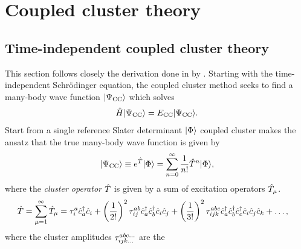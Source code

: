 \chapter{Coupled cluster theory}


    \section{Time-independent coupled cluster theory}
        This section follows closely the derivation done in
         by
        \citeauthor{crawford2000introduction} \cite{crawford2000introduction}.
        Starting with the time-independent Schrödinger equation, the coupled
        cluster method seeks to find a many-body wave function $| \Psi_{\text{CC}} \rangle$ which
        solves
        \begin{align}
            \hat{H}| \Psi_{\text{CC}} \rangle = E_{\text{CC}}| \Psi_{\text{CC}} \rangle.
        \end{align}
        Start from a single reference Slater determinant $| \Phi \rangle$ coupled
        cluster makes the ansatz that the true many-body wave function is given
        by
        \begin{align}
            | \Psi_{\text{CC}} \rangle \equiv e^{\hat{T}}| \Phi \rangle
            = \sum_{n = 0}^{\infty}\frac{1}{n!}\hat{T}^n| \Phi \rangle,
            \label{eq:cc_wave_function}
        \end{align}
        where the \emph{cluster operator} $\hat{T}$ is given by a sum of excitation
        operators $\hat{T}_{\mu}$.
        \begin{align}
            \hat{T} &= \sum_{\mu = 1}^{\infty} \hat{T}_{\mu}
            = \tau^a_i\hat{c}_{a}^{\dagger}\hat{c}_{i}
            + \left( \frac{1}{2!} \right)^2\tau^{ab}_{ij}\hat{c}_{a}^{\dagger}\hat{c}_{b}^{\dagger}\hat{c}_{i}\hat{c}_{j}
            + \left( \frac{1}{3!} \right)^2\tau^{abc}_{ijk}
            \hat{c}_{a}^{\dagger}\hat{c}_{b}^{\dagger}\hat{c}_{c}^{\dagger}\hat{c}_{i}\hat{c}_{j}\hat{c}_{k}
            + \dots,
            \label{eq:cluster-operator}
        \end{align}
        where the cluster amplitudes $\tau^{abc\dots}_{ijk\dots}$ are the
